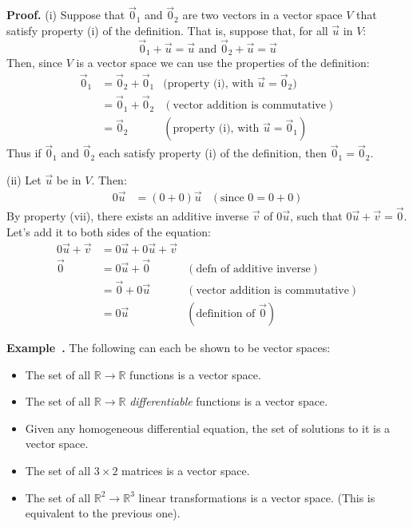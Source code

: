 \documentclass[11pt, letterpaper]{report}
\newenvironment{book}{}{}
\newcounter{example}[section]
\newcommand{\example}{\refstepcounter{example}%
\par\noindent\textbf{Example~\theexample.} }
\newcommand{\R}{\mathbb{R}}
\begin{document}
\begin{book}
\textbf{Proof.} (i) Suppose that $\vec{0}_1$ and $\vec{0}_2$ are two vectors in a vector space $V$ that satisfy property (i) of the definition. That is, suppose that, for all $\vec{u}$ in $V$:
\[\vec{0}_1+\vec{u}=\vec{u} \text{ and } \vec{0}_2+\vec{u}=\vec{u}\]
Then, since $V$ is a vector space we can use the properties of the definition:
\begin{align*}
\vec{0}_1 &= \vec{0}_2+\vec{0}_1 &\text{(property (i), with } \vec{u}=\vec{0}_2)\\
&= \vec{0}_1 + \vec{0}_2 &(\text{vector addition is commutative}) \\
&= \vec{0}_2 &(\text{property (i), with } \vec{u}=\vec{0}_1)
\end{align*}
Thus if $\vec{0}_1$ and $\vec{0}_2$ each satisfy property (i) of the definition, then $\vec{0}_1=\vec{0}_2$.

(ii) Let $\vec{u}$ be in $V$. Then:
\begin{align*}
0\vec{u} &= (0+0)\vec{u} & (\text{since } 0=0+0)
\end{align*}
By property (vii), there exists an additive inverse $\vec{v}$ of $0\vec{u}$, such that $0\vec{u}+\vec{v}=\vec{0}$. Let's add it to both sides of the equation:
\begin{align*}
0\vec{u} + \vec{v} &= 0\vec{u}+0\vec{u} + \vec{v} & \\
\vec{0} &= 0\vec{u} + \vec{0} & (\text{defn of additive inverse}) \\
&= \vec{0}+0\vec{u} & (\text{vector addition is commutative}) \\
&= 0\vec{u} & (\text{definition of }\vec{0})
\end{align*}
\blacksquare
\end{book}

\example The following can each be shown to be vector spaces: 
\begin{itemize}
\item The set of all $\R\rightarrow\R$ functions is a vector space.
\item The set of all $\R\rightarrow\R$ \emph{differentiable} functions is a vector space.
\item Given any homogeneous differential equation, the set of solutions to it is a vector space.
\item The set of all $3\times 2$ matrices is a vector space.
\item The set of all $\R^2\rightarrow\R^3$ linear transformations is a vector space. (This is equivalent to the previous one).
\end{itemize}
\end{document}
